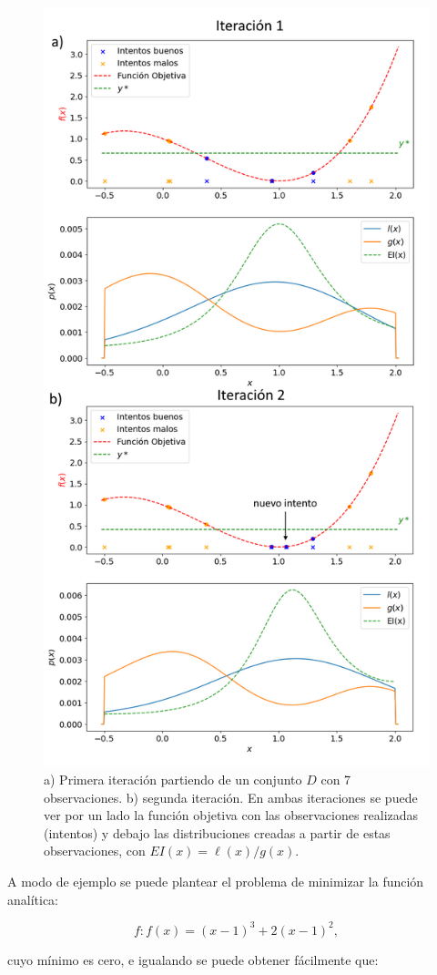 \begin{figure}[p]
\centering
\includegraphics[width=.75\columnwidth]{figs//tpe-example-2.png}
\caption{a) Primera iteración partiendo de un conjunto $D$ con 7 observaciones. b) segunda iteración. En ambas iteraciones se puede ver por un lado la función objetiva con las observaciones realizadas (intentos) y debajo las distribuciones creadas a partir de estas observaciones, con $EI(x) = \ell(x) / g(x)$.}
\label{fig:tpe-ex1}
\end{figure}

A modo de ejemplo se puede plantear el problema de minimizar la función analítica:

\[f: f(x) = (x-1)^3 + 2(x-1)^2,\]

cuyo mínimo es cero, e igualando se puede obtener fácilmente que:

